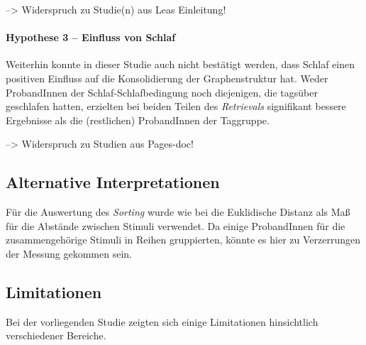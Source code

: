--> Widerspruch zu Studie(n) aus Leas Einleitung!

\paragraph{Hypothese 3 – Einfluss von Schlaf}
Weiterhin konnte in dieser Studie auch nicht bestätigt werden, dass Schlaf einen positiven Einfluss auf die Konsolidierung der Graphenstruktur hat. Weder ProbandInnen der Schlaf-Schlafbedingung noch diejenigen, die tagsüber geschlafen hatten, erzielten bei beiden Teilen des \textit{Retrievals} signifikant bessere Ergebnisse als die (restlichen) ProbandInnen der Taggruppe.

--> Widerspruch zu Studien aus Pages-doc!



\subsection{Alternative Interpretationen}
Für die Auswertung des \textit{Sorting} wurde wie bei \citet{Garvert2017}  die Euklidische Distanz als Maß für die Abstände zwischen Stimuli verwendet. Da einige ProbandInnen für die zusammengehörige Stimuli in Reihen gruppierten, könnte es hier zu Verzerrungen der Messung gekommen sein. 



\subsection{Limitationen}
Bei der vorliegenden Studie zeigten sich einige Limitationen hinsichtlich verschiedener Bereiche.
